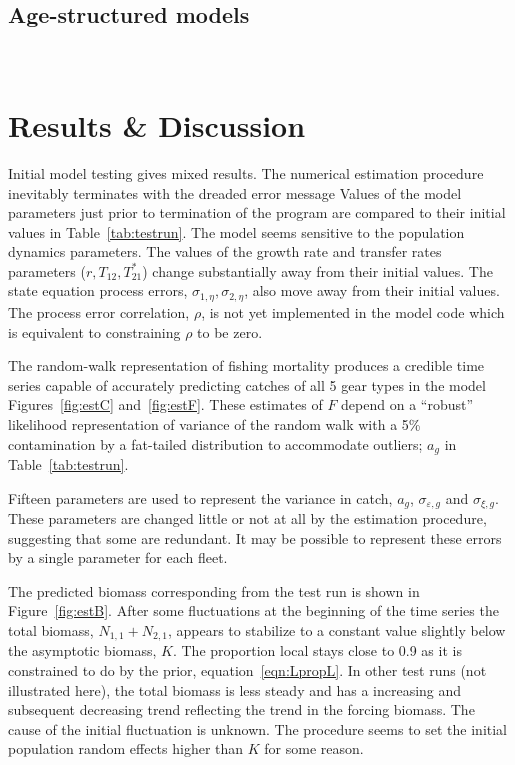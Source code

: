 \documentclass[12pt,letterpaper]{article}
\newcommand\help[1]{\color{Magenta}{\it #1 }\normalcolor}
\newcommand\Nsum{{N_{1,1}+N_{2,1}}}
\begin{document}
\subsection*{Age-structured models}
~

\centerline{\help{Not yet available.}}


\section*{Results \& Discussion}
Initial model testing gives mixed results. The numerical estimation
procedure inevitably terminates with the dreaded error message 
\help{``Matrix not positive definite in Ln\_det\_choleski''.
This message indicates that there are probably redundant and
ill-determined parameters.}
Values of the model parameters just prior to termination of the program are
compared to their initial values in Table~\ref{tab:testrun}.
The model seems sensitive to the population dynamics parameters. The
values of the
growth rate and transfer rates parameters ($r,T_{12}, T_{21}^*$)
change substantially away from their initial values.
The state equation process errors, $\sigma_{1,\eta},\sigma_{2,\eta}$,
also move away from their initial values.
The process error correlation, $\rho$, is not yet implemented in the model
code which is equivalent to constraining $\rho$ to be zero.

The random-walk representation of fishing mortality
produces a credible time series
capable of accurately predicting catches
of all 5 gear types in the model 
Figures~\ref{fig:estC} and~\ref{fig:estF}.
These estimates of $F$ depend on a ``robust'' likelihood representation
of variance of the random walk with a 5\% contamination by a fat-tailed
distribution to accommodate outliers; $a_g$ in Table~\ref{tab:testrun}.

Fifteen parameters are used to represent the variance in catch, $a_g$, 
$\sigma_{\varepsilon,g}$ and $\sigma_{\xi,g}$.
These parameters are changed little or not at all by the estimation
procedure, suggesting that some are redundant.
It may be possible to represent these errors by a single parameter for
each fleet.

The predicted biomass corresponding from the test run is shown in
Figure~\ref{fig:estB}. After some fluctuations at the beginning of
the time series the total biomass, $\Nsum$, appears to stabilize to a
constant value slightly below the asymptotic biomass, $K$. The
proportion local stays close to 0.9 as it is constrained to do by the
prior, equation~\ref{eqn:LpropL}.
In other test runs (not illustrated here), 
the total biomass is less steady and has a
increasing and subsequent decreasing trend reflecting the trend in the
forcing biomass.
The cause of the initial fluctuation is unknown. The procedure seems
to set the initial population random effects higher than $K$ for some
reason.
\end{document}
